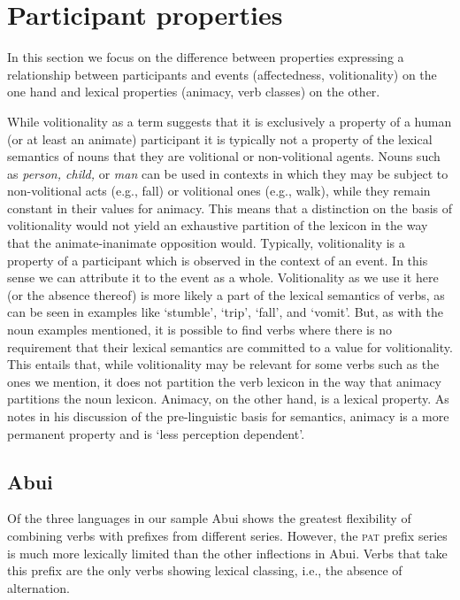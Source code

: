 \section{Participant properties}
\label{sec:10:5}
In this section we focus on the difference between properties expressing a relationship between participants and events (affectedness, volitionality) on the one hand and lexical properties (animacy, verb classes) on the other.

While volitionality as a term suggests that it is exclusively a property of a human (or at least an animate) participant it is typically not a property of the lexical semantics of nouns that they are volitional or non-volitional agents. Nouns such as \textit{person, child,} or \textit{man} can be used in contexts in which they may be subject to non-volitional acts (e.g., fall) or volitional ones (e.g., walk), while they remain constant in their values for animacy. This means that a distinction on the basis of volitionality would not yield an exhaustive partition of the lexicon in the way that the animate-inanimate opposition would. Typically, volitionality is a property of a participant which is observed in the context of an event. In this sense we can attribute it to the event as a whole. Volitionality as we use it here (or the absence thereof) is more likely a part of the lexical semantics of verbs, as can be seen in examples like `stumble', `trip', `fall', and `vomit'. But, as with the noun examples mentioned, it is possible to find verbs where there is no requirement that their lexical semantics are committed to a value for volitionality. This entails that, while volitionality may be relevant for some verbs such as the ones we mention, it does not partition the verb lexicon in the way that animacy partitions the noun lexicon.   Animacy, on the other hand, is a lexical property. As \citet[43]{Hurford2007} notes in his discussion of the pre-linguistic basis for semantics, animacy is a more permanent property and is `less perception dependent'.

\subsection{Abui}
\label{sec:10:5.1}
Of the three languages in our sample Abui shows the greatest flexibility of combining verbs with prefixes from different series. However, the \textsc{pat} prefix series is much more lexically limited than the other inflections  in Abui. Verbs that take this prefix are the only verbs showing lexical classing, i.e., the absence of alternation. 

